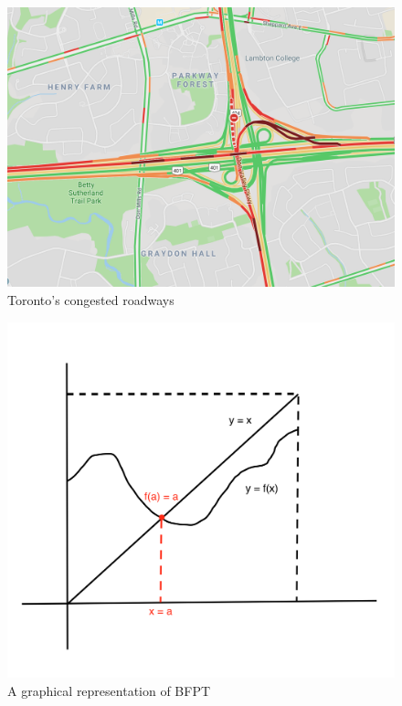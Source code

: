 \documentclass[final]{beamer}
\newlength{\onecolwid}
\begin{document}
\begin{frame}[t]
\begin{columns}[t]
\begin{column}{\onecolwid}
\begin{figure}
\includegraphics[width=1\linewidth]{graph2.png}
\caption{Toronto's congested roadways}
\end{figure}

\begin{figure}
\includegraphics[width=0.9\linewidth]{fixed2.png}
\caption{A graphical representation of BFPT}
\end{figure}


\end{column} %


\end{columns}
\end{frame}
\end{document}
